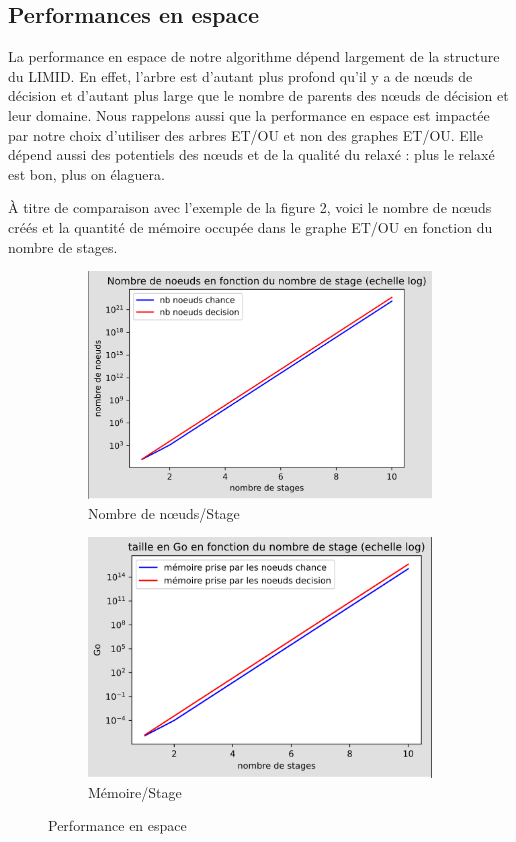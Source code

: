 \documentclass[12pt]{article}
\begin{document}
\subsection{Performances en espace}
La performance en espace de notre algorithme dépend largement de la structure du LIMID. 
En effet, l'arbre est d'autant plus profond qu'il y a de nœuds de décision et d'autant plus large que le nombre de parents des nœuds de décision et leur domaine. Nous rappelons aussi que la performance en espace est impactée par notre choix d'utiliser des arbres ET/OU et non des graphes ET/OU. Elle dépend aussi des potentiels des nœuds et de la qualité du relaxé : plus le relaxé est bon, plus on élaguera. 

À titre de comparaison avec l'exemple de la figure 2, voici le nombre de nœuds créés et la quantité de mémoire occupée dans le graphe ET/OU en fonction du nombre de stages.

\begin{figure}[ht]
\centering
\begin{subfigure}{.5\textwidth}
  \centering
  \includegraphics[width=.65\linewidth]{docs/ressources_rapport/perf_espace.png}
  \caption{Nombre de nœuds/Stage}
  \label{fig:sub8}
\end{subfigure}%
\begin{subfigure}{.5\textwidth}
  \centering
  \includegraphics[width=.65\linewidth]{docs/ressources_rapport/perf_Go.png}
  \caption{Mémoire/Stage}
  \label{fig:sub9}
\end{subfigure}
\caption{Performance en espace}
\label{fig:test4}
\end{figure}
\end{document}
